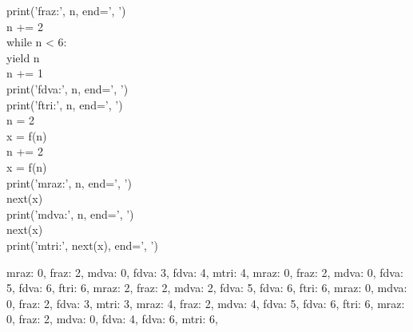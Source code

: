 \documentclass[addpoints,12pt]{exam}
\begin{document}
\begin{questions}
{\hspace*{0.6cm}print('fraz:', n, end=', ')\\
\hspace*{0.6cm}n += 2\\
\hspace*{0.6cm}while n \textless{} 6:\\
\hspace*{0.6cm}\hspace*{0.6cm}yield n\\
\hspace*{0.6cm}\hspace*{0.6cm}n += 1\\
\hspace*{0.6cm}\hspace*{0.6cm}print('fdva:', n, end=', ')\\
\hspace*{0.6cm}print('ftri:', n, end=', ')\\
n = 2\\
x = f(n)\\
n += 2\\
x = f(n)\\
print('mraz:', n, end=', ')\\
next(x)\\
print('mdva:', n, end=', ')\\
next(x)\\
print('mtri:', next(x), end=', ')}
\nopagebreak
\begin{choices}
\choice
mraz: 0, fraz: 2, mdva: 0, fdva: 3, fdva: 4, mtri: 4,
\choice
mraz: 0, fraz: 2, mdva: 0, fdva: 5, fdva: 6, ftri: 6,
\choice
mraz: 2, fraz: 2, mdva: 2, fdva: 5, fdva: 6, ftri: 6,
\choice
mraz: 0, mdva: 0, fraz: 2, fdva: 3, mtri: 3,
\choice
mraz: 4, fraz: 2, mdva: 4, fdva: 5, fdva: 6, ftri: 6,
\choice
mraz: 0, fraz: 2, mdva: 0, fdva: 4, fdva: 6, mtri: 6,
\end{choices}
\end{questions}
\end{document}
